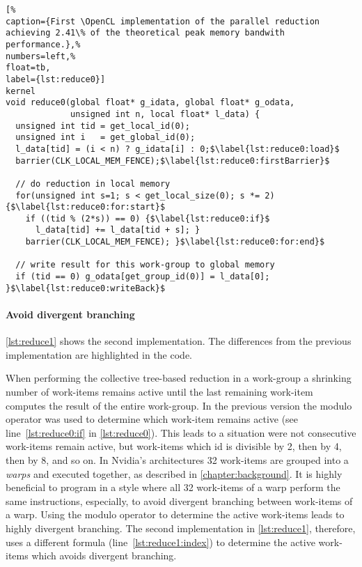 \begin{lstlisting}[%                                                             
caption={First \OpenCL implementation of the parallel reduction achieving 2.41\% of the theoretical peak memory bandwith performance.},%
numbers=left,%
float=tb,
label={lst:reduce0}]
kernel
void reduce0(global float* g_idata, global float* g_odata,
             unsigned int n, local float* l_data) {
  unsigned int tid = get_local_id(0);
  unsigned int i   = get_global_id(0);
  l_data[tid] = (i < n) ? g_idata[i] : 0;$\label{lst:reduce0:load}$
  barrier(CLK_LOCAL_MEM_FENCE);$\label{lst:reduce0:firstBarrier}$

  // do reduction in local memory
  for(unsigned int s=1; s < get_local_size(0); s *= 2) {$\label{lst:reduce0:for:start}$
    if ((tid % (2*s)) == 0) {$\label{lst:reduce0:if}$
      l_data[tid] += l_data[tid + s]; }
    barrier(CLK_LOCAL_MEM_FENCE); }$\label{lst:reduce0:for:end}$

  // write result for this work-group to global memory
  if (tid == 0) g_odata[get_group_id(0)] = l_data[0]; }$\label{lst:reduce0:writeBack}$
\end{lstlisting}

\FloatBarrier
\newpage

\paragraph{Avoid divergent branching}

\autoref{lst:reduce1} shows the second implementation.
The differences from the previous implementation are highlighted in the code.

When performing the collective tree-based reduction in a work-group a shrinking number of work-items remains active until the last remaining work-item computes the result of the entire work-group.
In the previous version the modulo operator was used to determine which work-item remains active (see line~\ref{lst:reduce0:if} in \autoref{lst:reduce0}).
This leads to a situation were not consecutive work-items remain active, but work-items which id is divisible by 2, then by 4, then by 8, and so on.
In Nvidia's \GPU architectures 32 work-items are grouped into a \emph{warps} and executed together, as described in \autoref{chapter:background}.
It is highly beneficial to program in a style where all 32 work-items of a warp perform the same instructions, especially, to avoid divergent branching between work-items of a warp.
Using the modulo operator to determine the active work-items leads to highly divergent branching.
The second implementation in \autoref{lst:reduce1}, therefore, uses a different formula (line~\ref{lst:reduce1:index}) to determine the active work-items which avoids divergent branching.

